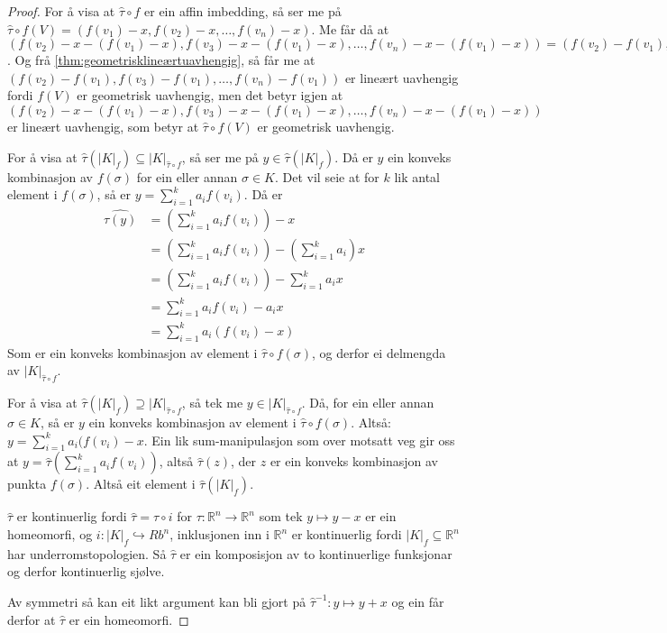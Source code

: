 \documentclass[a4paper, titlepage, 12pt, norsk]{article}
\theoremstyle{plain}
\theoremstyle{definition}
\newcommand{\Rb}{\mathbb{R}}
\newcommand{\gr}[1]{ \lvert #1 \rvert } %
\begin{document}
\begin{proof} %
	For å visa at \( \hat{\tau} \circ f \) er ein affin imbedding, så ser me på \( \hat{\tau} \circ f(V) = (f(v_1)-x, f(v_2)-x, \dots, f(v_n)-x) \). Me får då at \( (f(v_2)-x-(f(v_1)-x), f(v_3)-x-(f(v_1)-x), \dots, f(v_n)-x-(f(v_1)-x)) = ( f(v_2)-f(v_1), f(v_3)-f(v_1), \dots, f(v_n)-f(v_1) ) \). Og frå \autoref{thm:geometrisklineærtuavhengig}, så får me at \( ( f(v_2)-f(v_1), f(v_3)-f(v_1), \dots, f(v_n)-f(v_1) ) \) er lineært uavhengig fordi \( f(V) \) er geometrisk uavhengig, men det betyr igjen at \( (f(v_2)-x-(f(v_1)-x), f(v_3)-x-(f(v_1)-x), \dots, f(v_n)-x-(f(v_1)-x)) \) er lineært uavhengig, som betyr at \( \hat{\tau} \circ f(V) \) er geometrisk uavhengig.

	For å visa at \( \hat{\tau}(\gr{K}_f) \subseteq \gr{K}_{\hat{\tau} \circ f} \), så ser me på \( y \in \hat{\tau}(\gr{K}_f) \). Då er \( y \) ein konveks kombinasjon av \( f(\sigma) \) for ein eller annan \( \sigma \in K \). Det vil seie at for \( k \) lik antal element i \( f(\sigma) \), så er \( y = \sum_{i=1}^k a_i f(v_i) \). Då er
	\begin{align*}
		\hat{\tau(y)} &= \left(\sum_{i=1}^k a_i f(v_i)\right) - x \\
		&= \left(\sum_{i=1}^k a_i f(v_i)\right)-\left(\sum_{i=1}^k a_i \right)x \\
		&= \left(\sum_{i=1}^k a_i f(v_i)\right)-\sum_{i=1}^k a_i x \\
		&= \sum_{i=1}^k a_i f(v_i) - a_i x \\
		&= \sum_{i=1}^k a_i(f(v_i) - x)
	\end{align*}
	Som er ein konveks kombinasjon av element i \( \hat{\tau} \circ f(\sigma) \), og derfor ei delmengda av \( \gr{K}_{\hat{\tau} \circ f} \).

	For å visa at \( \hat{\tau}(\gr{K}_f) \supseteq \gr{K}_{\hat{\tau} \circ f} \), så tek me \( y \in \gr{K}_{\hat{\tau} \circ f} \). Då, for ein eller annan \( \sigma \in K \), så er \( y \) ein konveks kombinasjon av element i \( \hat{\tau}\circ f(\sigma) \). Altså: \(  y = \sum_{i=1}^k a_i (f(v_i) - x \). Ein lik sum-manipulasjon som over motsatt veg gir oss at \( y = \hat{\tau}\left(\sum_{i=1}^k a_i f(v_i)\right) \), altså \( \hat{\tau}(z) \), der \( z \) er ein konveks kombinasjon av punkta \( f(\sigma) \). Altså eit element i \( \hat{\tau}(\gr{K}_f) \).

	\( \hat{\tau} \) er kontinuerlig fordi \( \hat{\tau} = \tau \circ i \) for \( \tau: \Rb^n \to \Rb^n \) som tek \( y \mapsto y-x \) er ein homeomorfi, og \( i: \gr{K}_f \hookrightarrow Rb^n \), inklusjonen inn i \( \Rb^n \) er kontinuerlig fordi \( \gr{K}_f \subseteq \Rb^n \) har underromstopologien. Så \( \hat{\tau} \) er ein komposisjon av to kontinuerlige funksjonar og derfor kontinuerlig sjølve.

	Av symmetri så kan eit likt argument kan bli gjort på \( \hat{\tau}^{-1}: y \mapsto y+x \) og ein får derfor at \( \hat{\tau} \) er ein homeomorfi.
\end{proof}
\end{document}
